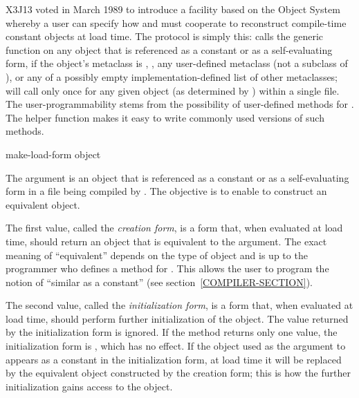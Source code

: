 \begin{newer}
X3J13 voted in March 1989  to introduce a facility
based on the Object System
whereby a user can specify how  and 
must cooperate to reconstruct compile-time constant objects at load time.
The protocol is simply this:
   calls the generic
  function  on any object that is referenced as
  a constant or as a self-evaluating form, if the object's metaclass is
  , , any user-defined metaclass (not a
  subclass of ), or any of a possibly empty
  implementation-defined list of other metaclasses;  will
  call  only once for any given object (as determined by )
  within a single file.  The user-programmability stems from the possibility
  of user-defined methods for .  The helper function
   makes it easy to write commonly used
  versions of such methods.

\begin{defun}
make-load-form object

The argument is an object that is
  referenced as a constant or as a self-evaluating form in a file being
  compiled by .  The objective is to enable  to
  construct an equivalent object.

  The first value, called the \emph{creation form}, is a form that, when
  evaluated at load time, should return an object that is equivalent to
  the argument.  The exact meaning of ``equivalent'' depends on the type
  of object and is up to the programmer who defines a method for
  .  This allows the user to program the notion
  of ``similar as a constant'' (see section~\ref{COMPILER-SECTION}).

  The second value, called the \emph{initialization form}, is a form that,
  when evaluated at load time, should perform further initialization of
  the object.  The value returned by the initialization form is ignored.
  If the  method returns only one value, the
  initialization form is , which has no effect.  If the object used
  as the argument to  appears as a constant in the
  initialization form, at load time it will be replaced by the
  equivalent object constructed by the creation form; this is how the
  further initialization gains access to the object.


\end{defun}
\end{newer}
